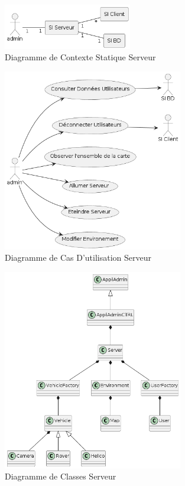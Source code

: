 \documentclass[12pt,a4paper]{scrartcl}
\begin{document}
\begin{figure}[p]
    \centering
    \includegraphics[width=0.5\textwidth]{DiagCS_Admin.png}
    \caption{Diagramme de Contexte Statique Serveur}\label{cs_serv}
\end{figure}

\begin{figure}[p]
    \centering
    \includegraphics[width=0.7\textwidth]{Diag_UC_Admin.png}
    \caption{Diagramme de Cas D'utilisation Serveur}\label{uc_serv}
\end{figure}

\begin{figure}[p]
    \centering
    \includegraphics[width=0.7\textwidth]{Diag_Class_Admin.png}
    \caption{Diagramme de Classes Serveur}\label{seq_serv}
\end{figure}
\end{document}
